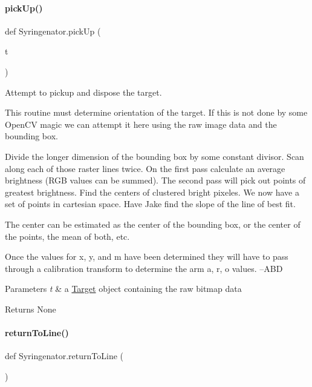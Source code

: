 \paragraph{\texorpdfstring{pickUp()}{pickUp()}}
{\footnotesize\ttfamily def Syringenator.\+pick\+Up (\begin{DoxyParamCaption}\item[{}]{t }\end{DoxyParamCaption})}



Attempt to pickup and dispose the target. 

This routine must determine orientation of the target. If this is not done by some Open\+CV magic we can attempt it here using the raw image data and the bounding box.

Divide the longer dimension of the bounding box by some constant divisor. Scan along each of those raster lines twice. On the first pass calculate an average brightness (R\+GB values can be summed). The second pass will pick out points of greatest brightness. Find the centers of clustered bright pixeles. We now have a set of points in cartesian space. Have Jake find the slope of the line of best fit.

The center can be estimated as the center of the bounding box, or the center of the points, the mean of both, etc.

Once the values for x, y, and m have been determined they will have to pass through a calibration transform to determine the arm a, r, o values. --A\+BD


\begin{DoxyParams}{Parameters}
{\em t} & a \mbox{\hyperlink{classSyringenator_1_1Target}{Target}} object containing the raw bitmap data \\
\hline
\end{DoxyParams}
\begin{DoxyReturn}{Returns}
None 
\end{DoxyReturn}
\mbox{\label{namespaceSyringenator_afe04905c8a4a9d077457422866633203}} 
\paragraph{\texorpdfstring{returnToLine()}{returnToLine()}}
{\footnotesize\ttfamily def Syringenator.\+return\+To\+Line (\begin{DoxyParamCaption}{ }\end{DoxyParamCaption})}



